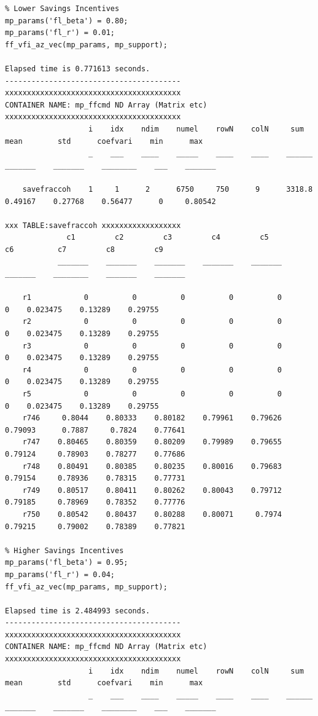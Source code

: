 \documentclass[
]{book}
\begin{document}
\begin{verbatim}
% Lower Savings Incentives
mp_params('fl_beta') = 0.80;
mp_params('fl_r') = 0.01;
ff_vfi_az_vec(mp_params, mp_support);

Elapsed time is 0.771613 seconds.
----------------------------------------
xxxxxxxxxxxxxxxxxxxxxxxxxxxxxxxxxxxxxxxx
CONTAINER NAME: mp_ffcmd ND Array (Matrix etc)
xxxxxxxxxxxxxxxxxxxxxxxxxxxxxxxxxxxxxxxx
                   i    idx    ndim    numel    rowN    colN     sum       mean        std      coefvari    min      max  
                   _    ___    ____    _____    ____    ____    ______    _______    _______    ________    ___    _______

    savefraccoh    1     1      2      6750     750      9      3318.8    0.49167    0.27768    0.56477      0     0.80542

xxx TABLE:savefraccoh xxxxxxxxxxxxxxxxxx
              c1         c2         c3         c4         c5         c6          c7         c8         c9   
            _______    _______    _______    _______    _______    _______    ________    _______    _______

    r1            0          0          0          0          0          0    0.023475    0.13289    0.29755
    r2            0          0          0          0          0          0    0.023475    0.13289    0.29755
    r3            0          0          0          0          0          0    0.023475    0.13289    0.29755
    r4            0          0          0          0          0          0    0.023475    0.13289    0.29755
    r5            0          0          0          0          0          0    0.023475    0.13289    0.29755
    r746     0.8044    0.80333    0.80182    0.79961    0.79626    0.79093      0.7887     0.7824    0.77641
    r747    0.80465    0.80359    0.80209    0.79989    0.79655    0.79124     0.78903    0.78277    0.77686
    r748    0.80491    0.80385    0.80235    0.80016    0.79683    0.79154     0.78936    0.78315    0.77731
    r749    0.80517    0.80411    0.80262    0.80043    0.79712    0.79185     0.78969    0.78352    0.77776
    r750    0.80542    0.80437    0.80288    0.80071     0.7974    0.79215     0.79002    0.78389    0.77821

% Higher Savings Incentives
mp_params('fl_beta') = 0.95;
mp_params('fl_r') = 0.04;
ff_vfi_az_vec(mp_params, mp_support);

Elapsed time is 2.484993 seconds.
----------------------------------------
xxxxxxxxxxxxxxxxxxxxxxxxxxxxxxxxxxxxxxxx
CONTAINER NAME: mp_ffcmd ND Array (Matrix etc)
xxxxxxxxxxxxxxxxxxxxxxxxxxxxxxxxxxxxxxxx
                   i    idx    ndim    numel    rowN    colN     sum       mean        std      coefvari    min      max  
                   _    ___    ____    _____    ____    ____    ______    _______    _______    ________    ___    _______


\end{verbatim}
\end{document}

